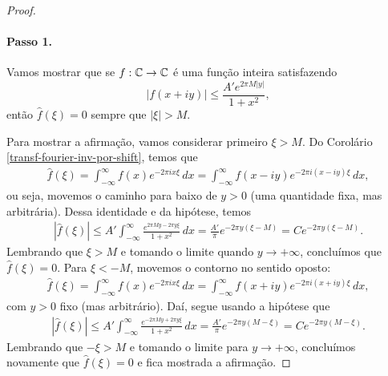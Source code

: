 \begin{proof}
            \paragraph{Passo 1.} Vamos mostrar que se $f:\mathbb{C}\to\mathbb{C}$ é uma
            função inteira satisfazendo
            \begin{equation*}
                |f(x+iy)| \leq \frac{A'e^{2\pi M|y|}}{1+x^2},
            \end{equation*}
            então $\widehat{f}(\xi) = 0$ sempre que $|\xi| > M$.
            
            Para mostrar a afirmação, vamos considerar primeiro $\xi>M$.
            Do Corolário \ref{transf-fourier-inv-por-shift}, temos que
            \begin{align*}
                \widehat{f}(\xi) 
                = \int_{-\infty}^{\infty} f(x)e^{-2\pi ix\xi} \, dx
                = \int_{-\infty}^{\infty} f(x-iy)e^{-2\pi i(x-iy)\xi} \, dx,
            \end{align*}
            ou seja, movemos o caminho para baixo de $y>0$ (uma quantidade
            fixa, mas arbitrária). Dessa identidade e da hipótese, temos
            \begin{align*}
                |\widehat{f}(\xi)| 
                \leq A'\int_{-\infty}^{\infty} \frac{ e^{2\pi My 
                - 2\pi y\xi}}{1+x^2} \, dx 
                = \frac{A'}{\pi}e^{-2\pi y(\xi - M)}
                = Ce^{-2\pi y(\xi - M)}.
            \end{align*}
            Lembrando que $\xi>M$ e tomando o limite quando $y\to +\infty$,
            concluímos que $\widehat{f}(\xi) = 0$. Para $\xi<-M$, movemos
            o contorno no sentido oposto:
            \begin{align*}
                \widehat{f}(\xi) 
                = \int_{-\infty}^{\infty} f(x)e^{-2\pi ix\xi} \, dx
                = \int_{-\infty}^{\infty} f(x+iy)e^{-2\pi i(x+iy)\xi} \, dx,
            \end{align*}
            com $y>0$ fixo (mas arbitrário). Daí, segue usando a hipótese que
            \begin{align*}
                |\widehat{f}(\xi)| 
                \leq A'\int_{-\infty}^{\infty} \frac{ e^{-2\pi My 
                + 2\pi y\xi}}{1+x^2} \, dx 
                = \frac{A'}{\pi}e^{-2\pi y(M - \xi)}
                = Ce^{-2\pi y(M -\xi)}.
            \end{align*}
            Lembrando que $-\xi > M$ e tomando o limite para $y\to +\infty$,
            concluímos novamente que $\widehat{f}(\xi) = 0$ e fica mostrada
            a afirmação.

\end{proof}
